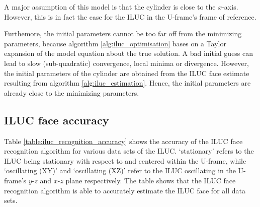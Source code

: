 A major assumption of this model is that the cylinder is close to the $x$-axis. However, this is in fact the case for the ILUC in the U-frame's frame of reference.

Furthemore, the initial parameters cannot be too far off from the minimizing parameters, because algorithm \ref{alg:iluc_optimisation} bases on a Taylor expansion of the model equation about the true solution. A bad initial guess can lead to slow (sub-quadratic) convergence, local minima or divergence. However, the initial parameters of the cylinder are obtained from the ILUC face estimate resulting from algorithm \ref{alg:iluc_estimation}. Hence, the initial parameters are already close to the minimizing parameters.

\subsection{ILUC face accuracy}\label{ssec:iluc_face_accuracy}
Table \ref{table:iluc_recognition_accuracy} shows the accuracy of the ILUC face recognition algorithm for various data sets of the ILUC. `stationary' refers to the ILUC being stationary with respect to and centered within the U-frame, while `oscillating (XY)' and `oscillating (XZ)' refer to the ILUC oscillating in the U-frame's $y$-$z$ and $x$-$z$ plane respectively. The table shows that the ILUC face recognition algorithm is able to accurately estimate the ILUC face for all data sets.
